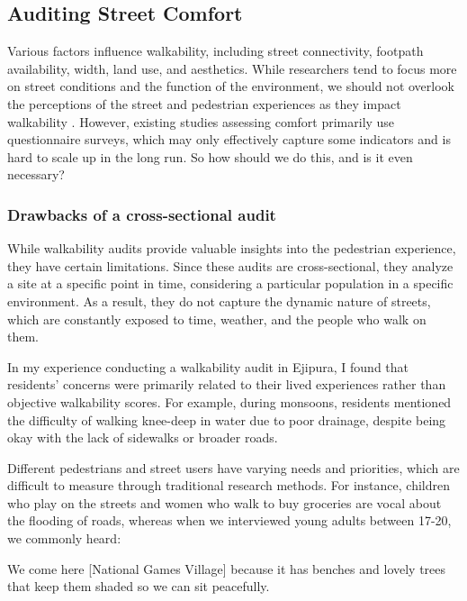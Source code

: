 \documentclass[
]{latex/krantz}
\renewenvironment{quote}{\begin{VF}}{\end{VF}}
\begin{document}
\newpage

\hypertarget{street-comfort-qualitative}{%
\subsection{Auditing Street Comfort}\label{street-comfort-qualitative}}

Various factors influence walkability, including street connectivity, footpath availability, width, land use, and aesthetics. While researchers tend to focus more on street conditions and the function of the environment, we should not overlook the perceptions of the street and pedestrian experiences as they impact walkability \autocite{tongDevelopingMultiscaleWalkability}. However, existing studies assessing comfort primarily use questionnaire surveys, which may only effectively capture some indicators and is hard to scale up in the long run. So how should we do this, and is it even necessary?

\hypertarget{drawbacks-of-a-cross-sectional-audit}{%
\subsubsection{Drawbacks of a cross-sectional audit}\label{drawbacks-of-a-cross-sectional-audit}}

While walkability audits provide valuable insights into the pedestrian experience, they have certain limitations. Since these audits are cross-sectional, they analyze a site at a specific point in time, considering a particular population in a specific environment. As a result, they do not capture the dynamic nature of streets, which are constantly exposed to time, weather, and the people who walk on them.

In my experience conducting a walkability audit in Ejipura, I found that residents' concerns were primarily related to their lived experiences rather than objective walkability scores. For example, during monsoons, residents mentioned the difficulty of walking knee-deep in water due to poor drainage, despite being okay with the lack of sidewalks or broader roads.

Different pedestrians and street users have varying needs and priorities, which are difficult to measure through traditional research methods. For instance, children who play on the streets and women who walk to buy groceries are vocal about the flooding of roads, whereas when we interviewed young adults between 17-20, we commonly heard:

\begin{quote}
We come here {[}National Games Village{]} because it has benches and lovely trees that keep them shaded so we can sit peacefully.
\end{quote}
\end{document}
